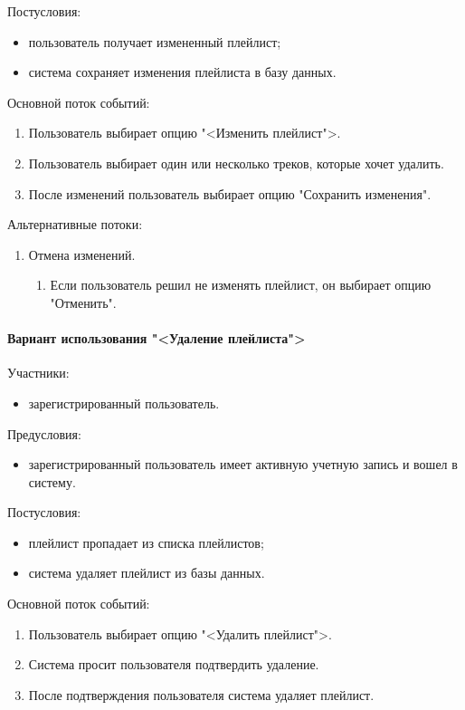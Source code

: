 Постусловия:
\begin{itemize}
	\item пользователь получает измененный плейлист;
	\item система сохраняет изменения плейлиста в базу данных.
\end{itemize}

Основной поток событий:
\begin{enumerate}
	\item Пользователь выбирает опцию "<Изменить плейлист">.
	\item Пользователь выбирает один или несколько треков, которые хочет удалить.
	\item После изменений пользователь выбирает опцию "Сохранить изменения".
\end{enumerate}

Альтернативные потоки:
\begin{enumerate}
	\item Отмена изменений.
	\begin{enumerate}
		\item Если пользователь решил не изменять плейлист, он выбирает опцию "Отменить".
	\end{enumerate}
\end{enumerate}

\paragraph{Вариант использования "<Удаление плейлиста">}

Участники:
\begin{itemize}
	\item зарегистрированный пользователь.
\end{itemize}

Предусловия:
\begin{itemize}
	\item зарегистрированный пользователь имеет активную учетную запись и вошел в систему.
\end{itemize}

Постусловия:
\begin{itemize}
	\item плейлист пропадает из списка плейлистов;
	\item система удаляет плейлист из базы данных.
\end{itemize}

Основной поток событий:
\begin{enumerate}
	\item Пользователь выбирает опцию "<Удалить плейлист">.
	\item Система просит пользователя подтвердить удаление.
	\item После подтверждения пользователя система удаляет плейлист.
\end{enumerate}

